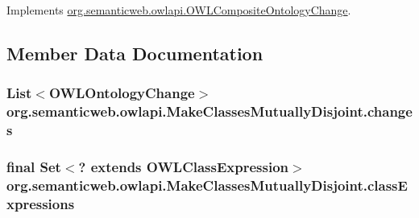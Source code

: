 Implements \hyperlink{interfaceorg_1_1semanticweb_1_1owlapi_1_1_o_w_l_composite_ontology_change_a047d3f540ac840c0ac0285bc576636d2}{org.\-semanticweb.\-owlapi.\-O\-W\-L\-Composite\-Ontology\-Change}.



\subsection{Member Data Documentation}
\hypertarget{classorg_1_1semanticweb_1_1owlapi_1_1_make_classes_mutually_disjoint_a4824637c5e7a21e790c59261fa4dc0fa}{
\subsubsection[{changes}]{\setlength{\rightskip}{0pt plus 5cm}List$<${\bf O\-W\-L\-Ontology\-Change}$>$ org.\-semanticweb.\-owlapi.\-Make\-Classes\-Mutually\-Disjoint.\-changes\hspace{0.3cm}{\ttfamily [private]}}}\label{classorg_1_1semanticweb_1_1owlapi_1_1_make_classes_mutually_disjoint_a4824637c5e7a21e790c59261fa4dc0fa}
\hypertarget{classorg_1_1semanticweb_1_1owlapi_1_1_make_classes_mutually_disjoint_a57759e02e23e59ab2eeb7912773669bf}{
\subsubsection[{class\-Expressions}]{\setlength{\rightskip}{0pt plus 5cm}final Set$<$? extends {\bf O\-W\-L\-Class\-Expression}$>$ org.\-semanticweb.\-owlapi.\-Make\-Classes\-Mutually\-Disjoint.\-class\-Expressions\hspace{0.3cm}{\ttfamily [private]}}}\label{classorg_1_1semanticweb_1_1owlapi_1_1_make_classes_mutually_disjoint_a57759e02e23e59ab2eeb7912773669bf}
